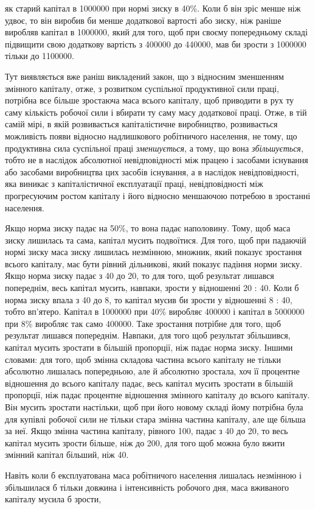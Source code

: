 \parcont{}  %
як старий капітал в 1000000 при нормі зиску в 40\%. Коли б він
зріс менше ніж удвоє, то він виробив би менше додаткової
вартості або зиску, ніж раніше виробляв капітал в 1000000,
який для того, щоб при своєму попередньому складі підвищити
свою додаткову вартість з 400000 до 440000, мав би зрости
з 1000000 тільки до 1100000.

Тут виявляється вже раніш викладений закон, що з відносним
зменшенням змінного капіталу, отже, з розвитком суспільної
продуктивної сили праці, потрібна все більше зростаюча маса
всього капіталу, щоб приводити в рух ту саму кількість робочої
сили і вбирати ту саму масу додаткової праці. Отже, в тій
самій мірі, в якій розвивається капіталістичне виробництво, розвивається
можливість появи відносно надлишкового робітничого
населення, не тому, що продуктивна сила суспільної праці \emph{зменшується},
а тому, що вона \emph{збільшується}, тобто не в наслідок
абсолютної невідповідності між працею і засобами існування
або засобами виробництва цих засобів існування, а в наслідок
невідповідності, яка виникає з капіталістичної експлуатації праці,
невідповідності між прогресуючим ростом капіталу і його відносно
меншаючою потребою в зростанні населення.

Якщо норма зиску падає на 50\%, то вона падає наполовину.
Тому, щоб маса зиску лишилась та сама, капітал мусить подвоїтися.
Для того, щоб при падаючій нормі зиску маса зиску лишилась
незмінною, множник, який показує зростання всього капіталу,
має бути рівний дільникові, який показує падіння норми зиску.
Якщо норма зиску падає з 40 до 20, то для того, щоб результат
лишався попереднім, весь капітал мусить, навпаки, зрости у відношенні
20 : 40. Коли б норма зиску впала з 40 до 8, то капітал
мусив би зрости у відношенні 8 : 40, тобто вп’ятеро. Капітал
в 1000000 при 40\% виробляє 400000 і капітал в 5000000 при 8\%
виробляє так само 400000. Таке зростання потрібне для того, щоб
результат лишався попереднім. Навпаки, для того щоб результат
збільшився, капітал мусить зростати в більшій пропорції, ніж
падає норма зиску. Іншими словами: для того, щоб змінна складова
частина всього капіталу не тільки абсолютно лишалась
попередньою, але й абсолютно зростала, хоч її процентне відношення
до всього капіталу падає, весь капітал мусить зростати
в більшій пропорції, ніж падає процентне відношення змінного
капіталу до всього капіталу. Він мусить зростати настільки,
щоб при його новому складі йому потрібна була для купівлі
робочої сили не тільки стара змінна частина капіталу, але ще
більша за неї. Якщо змінна частина капіталу, рівного 100,
падає з 40 до 20, то весь капітал мусить зрости більше, ніж до
200, для того щоб можна було вжити змінний капітал більший,
ніж 40.

Навіть коли б експлуатована маса робітничого населення
лишалась незмінною і збільшилася б тільки довжина і інтенсивність
робочого дня, маса вживаного капіталу мусила б зрости,
\parbreak{}  %
